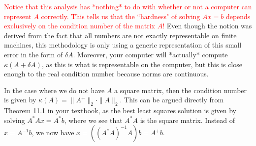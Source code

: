 \documentclass{ximera}
\begin{document}
\textcolor{red}{Notice that this analysis has *nothing* to do with whether or not a computer can represent $A$ correctly.  This tells us that the ``hardness" of solving $Ax = b$ depends exclusively on the condition number of the matrix $A$!}  Even though the notion was derived from the fact that all numbers are not exactly representable on finite machines, this methodology is only using a generic representation of this small error in the form of $\delta A$.  Moreover, your computer will *actually* compute $\kappa(A+\delta A)$, as this is what is representable on the computer, but this is close enough to the real condition number because norms are continuous.

In the case where we do not have $A$ a square matrix, then the condition number is given by $\kappa(A) = \|A^+\|_2\cdot \|A\|_2$.  This can be argued directly from Theorem 11.1 in your textbook, as the best least squares solution is given by solving $A^*Ax = A^*b$, where we see that $A^*A$ is the square matrix.  Instead of $x = A^{-1}b$, we now have $x = ((A^*A)^{-1}A)b = A^+b.$



    
\end{document}
